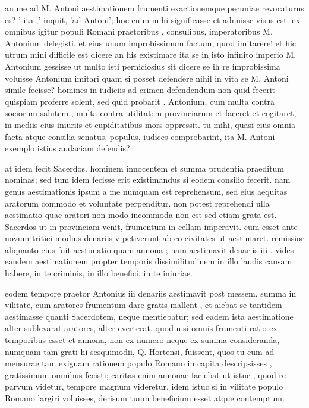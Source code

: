  an me ad M. Antoni aestimationem frumenti exactionemque pecuniae revocaturus es? ' ita ,' inquit, 'ad Antoni'; hoc enim mihi significasse et adnuisse visus est. ex omnibus igitur populi Romani praetoribus , consulibus, imperatoribus M. Antonium delegisti, et eius unum improbissimum factum, quod imitarere! et hic utrum mini difficile est dicere an his existimare ita se in isto infinito imperio M. Antonium gessisse ut multo isti perniciosius sit dicere se ih re improbissima voluisse Antonium imitari quam si posset defendere nihil in vita se M. Antoni simile fecisse? homines in iudiciis ad crimen defendendum non quid fecerit quispiam proferre solent, sed quid probarit . Antonium, cum multa contra sociorum salutem , multa contra utilitatem provinciarum et faceret et cogitaret, in mediis eius iniuriis et cupiditatibus mors oppressit. tu mihi, quasi eius omnia facta atque consilia senatus, populus, iudices comprobarint, ita M. Antoni exemplo istius audaciam defendis?

 at idem fecit Sacerdos. hominem innocentem et summa prudentia praeditum nominas; sed tum idem fecisse erit existimandus si eodem consilio fecerit. nam genus aestimationis ipsum a me numquam est reprehensum, sed eius aequitas aratorum commodo et voluntate perpenditur. non potest reprehendi ulla aestimatio quae aratori non modo incommoda non est sed etiam grata est. Sacerdos ut in provinciam venit, frumentum in cellam imperavit. cum esset ante novum tritici modius denariis v petiverunt ab eo civitates ut aestimaret. remissior aliquanto eius fuit aestimatio quam annona ; nam aestimavit denariis iii . vides eandem aestimationem propter temporis dissimilitudinem in illo laudis causam habere, in te criminis, in illo benefici, in te iniuriae.

 eodem tempore praetor Antonius iii denariis aestimavit post messem, summa in vilitate, cum aratores frumentum dare gratis mallent , et aiebat se tantidem aestimasse quanti Sacerdotem, neque mentiebatur; sed eadem ista aestimatione alter sublevarat aratores, alter everterat. quod nisi omnis frumenti ratio ex temporibus esset et annona, non ex numero neque ex summa consideranda, numquam tam grati hi sesquimodii, Q. Hortensi, fuissent, quos tu cum ad mensurae tam exiguam rationem populo Romano in capita descripsisses , gratissimum omnibus fecisti; caritas enim annonae faciebat ut istuc , quod re parvum videtur, tempore magnum videretur. idem istuc si in vilitate populo Romano largiri voluisses, derisum tuum beneficium esset atque contemptum.

